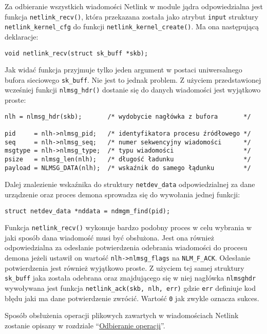 Za odbieranie wszystkich wiadomości Netlink w module jądra
odpowiedzialna jest funkcja \texttt{netlink\_recv()}, która przekazana
została jako atrybut \texttt{input} struktury
\texttt{netlink\_kernel\_cfg} do funkcji
\texttt{netlink\_kernel\_create()}. Ma ona następującą deklaracje:

\begin{verbatim}
void netlink_recv(struct sk_buff *skb);
\end{verbatim}

Jak widać funkcja przyjmuje tylko jeden argument w postaci uniwersalnego
bufora sieciowego \texttt{sk\_buff}. Nie jest to jednak problem. Z
użyciem przedstawionej wcześniej funkcji \texttt{nlmsg\_hdr()} dostanie
się do danych wiadomości jest wyjątkowo proste:

\begin{verbatim}
nlh = nlmsg_hdr(skb);       /* wydobycie nagłówka z bufora       */

pid     = nlh->nlmsg_pid;   /* identyfikatora procesu źródłowego */
seq     = nlh->nlmsg_seq;   /* numer sekwencyjny wiadomości      */
msgtype = nlh->nlmsg_type;  /* typu wiadomości                   */
psize   = nlmsg_len(nlh);   /* długość ładunku                   */
payload = NLMSG_DATA(nlh);  /* wskaźnik do samego łądunku        */
\end{verbatim}

Dalej znalezienie wskaźnika do struktury \texttt{netdev\_data}
odpowiedzialnej za dane urządzenie oraz proces demona sprowadza się do
wywołania jednej funkcji:

\begin{verbatim}
struct netdev_data *nddata = ndmgm_find(pid);
\end{verbatim}

Funkcja \texttt{netlink\_recv()} wykonuje bardzo podobny proces w celu
wybrania w jaki sposób dana wiadomość musi być obsłużona. Jest ona
również odpowiedzialna za odesłanie potwierdzenia odebrania wiadomości
do procesu demona jeżeli ustawił on wartość
\texttt{nlh-\textgreater{}nlmsg\_flags} na \texttt{NLM\_F\_ACK}.
Odesłanie potwierdzenia jest również wyjątkowo proste. Z użyciem tej
samej struktury \texttt{sk\_buff} jaka została odebrana oraz
znajdującego się w niej nagłówka \texttt{nlmsghdr} wywoływana jest
funkcja \texttt{netlink\_ack(skb, nlh, err)} gdzie \texttt{err}
definiuje kod błędu jaki ma dane potwierdzenie zwrócić. Wartość
\texttt{0} jak zwykle oznacza sukces.

Sposób obsłużenia operacji plikowych zawartych w wiadomościach Netlink
zostanie opisany w rozdziale ``\hyperref[odbieranie-operacji]{Odbieranie
operacji}''.

